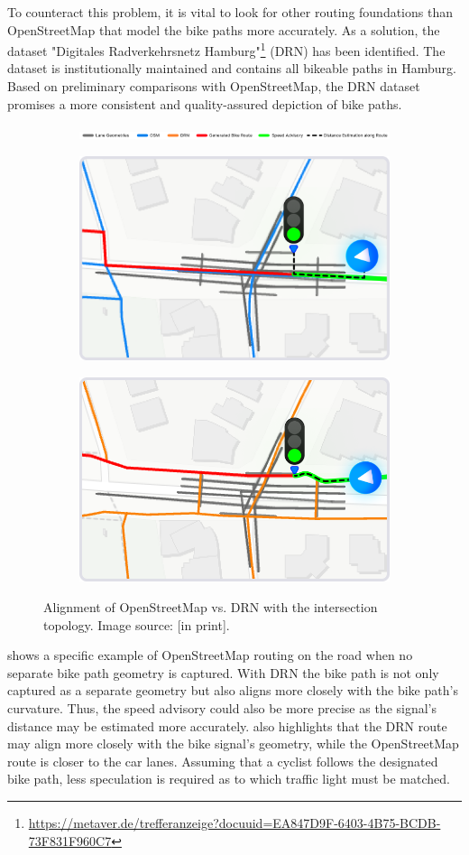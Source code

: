 To counteract this problem, it is vital to look for other routing foundations than OpenStreetMap that model the bike paths more accurately. As a solution, the dataset "Digitales Radverkehrsnetz Hamburg"\footnote{\url{https://metaver.de/trefferanzeige?docuuid=EA847D9F-6403-4B75-BCDB-73F831F960C7}} (DRN) has been identified. The dataset is institutionally maintained and contains all bikeable paths in Hamburg. Based on preliminary comparisons with OpenStreetMap, the DRN dataset promises a more consistent and quality-assured depiction of bike paths.

\begin{figure}[htbp]
\centering
\begin{subfigure}
  \centering
  \includegraphics[width=\linewidth]{images/legend-fig-1.png}
\end{subfigure}
\begin{subfigure}
  \centering
  \includegraphics[width=.49\linewidth]{images/osm-route.png}
\end{subfigure}%
\begin{subfigure}
  \centering
  \includegraphics[width=.49\linewidth]{images/drn-route.png}
\end{subfigure}
\caption{Alignment of OpenStreetMap vs. DRN with the intersection topology. Image source: [in print].}
\label{fig:comparison}%
\end{figure}

 shows a specific example of OpenStreetMap routing on the road when no separate bike path geometry is captured. With DRN the bike path is not only captured as a separate geometry but also aligns more closely with the bike path's curvature. Thus, the speed advisory could also be more precise as the signal's distance may be estimated more accurately.  also highlights that the DRN route may align more closely with the bike signal's geometry, while the OpenStreetMap route is closer to the car lanes. Assuming that a cyclist follows the designated bike path, less speculation is required as to which traffic light must be matched. 

